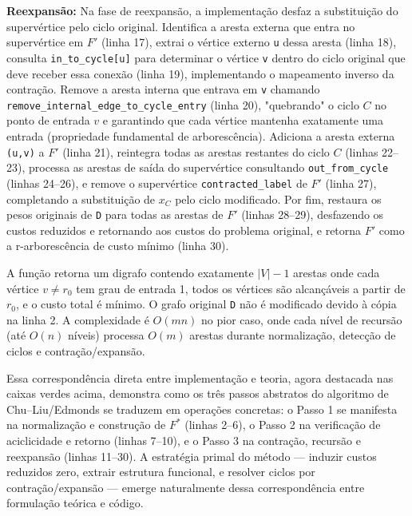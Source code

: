 \begin{tcolorbox}
    \textbf{Reexpansão:} Na fase de reexpansão, a implementação desfaz a substituição do supervértice pelo ciclo original. Identifica a aresta externa que entra no supervértice em \(F'\) (linha 17), extrai o vértice externo \texttt{u} dessa aresta (linha 18), consulta \texttt{in\_to\_cycle[u]} para determinar o vértice \texttt{v} dentro do ciclo original que deve receber essa conexão (linha 19), implementando o mapeamento inverso da contração. Remove a aresta interna que entrava em \texttt{v} chamando \texttt{remove\_internal\_edge\_to\_cycle\_entry} (linha 20), "quebrando" o ciclo \(C\) no ponto de entrada \(v\) e garantindo que cada vértice mantenha exatamente uma entrada (propriedade fundamental de arborescência). Adiciona a aresta externa \texttt{(u,v)} a \(F'\) (linha 21), reintegra todas as arestas restantes do ciclo \(C\) (linhas 22--23), processa as arestas de saída do supervértice consultando \texttt{out\_from\_cycle} (linhas 24--26), e remove o supervértice \texttt{contracted\_label} de \(F'\) (linha 27), completando a substituição de \(x_C\) pelo ciclo modificado. Por fim, restaura os pesos originais de \texttt{D} para todas as arestas de \(F'\) (linhas 28--29), desfazendo os custos reduzidos e retornando aos custos do problema original, e retorna \(F'\) como a r-arborescência de custo mínimo (linha 30).
\end{tcolorbox}

A função retorna um digrafo contendo exatamente \(|V|-1\) arestas onde cada vértice \(v \neq r_0\) tem grau de entrada 1, todos os vértices são alcançáveis a partir de \(r_0\), e o custo total é mínimo. O grafo original \texttt{D} não é modificado devido à cópia na linha 2. A complexidade é \(O(mn)\) no pior caso, onde cada nível de recursão (até \(O(n)\) níveis) processa \(O(m)\) arestas durante normalização, detecção de ciclos e contração/expansão.

Essa correspondência direta entre implementação e teoria, agora destacada nas caixas verdes acima, demonstra como os três passos abstratos do algoritmo de Chu–Liu/Edmonds se traduzem em operações concretas: o Passo 1 se manifesta na normalização e construção de \(F^*\) (linhas 2--6), o Passo 2 na verificação de aciclicidade e retorno (linhas 7--10), e o Passo 3 na contração, recursão e reexpansão (linhas 11--30). A estratégia primal do método — induzir custos reduzidos zero, extrair estrutura funcional, e resolver ciclos por contração/expansão — emerge naturalmente dessa correspondência entre formulação teórica e código.

